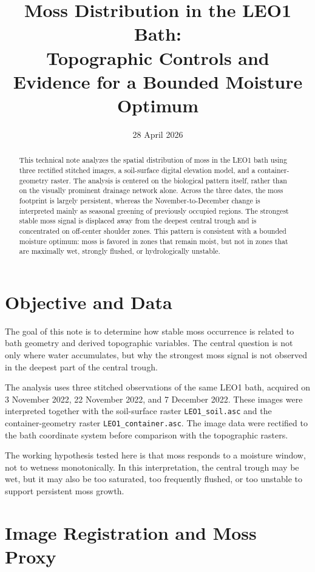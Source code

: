 \documentclass[11pt,a4paper]{article}
\title{Moss Distribution in the LEO1 Bath:\\
Topographic Controls and Evidence for a Bounded Moisture Optimum}
\author{}
\date{28 April 2026}
\begin{document}
\maketitle

\begin{abstract}
This technical note analyzes the spatial distribution of moss in the LEO1 bath
using three rectified stitched images, a soil-surface digital elevation model,
and a container-geometry raster. The analysis is centered on the biological
pattern itself, rather than on the visually prominent drainage network alone.
Across the three dates, the moss footprint is largely persistent, whereas the
November-to-December change is interpreted mainly as seasonal greening of
previously occupied regions. The strongest stable moss signal is displaced away
from the deepest central trough and is concentrated on off-center shoulder zones.
This pattern is consistent with a bounded moisture optimum: moss is favored in
zones that remain moist, but not in zones that are maximally wet, strongly
flushed, or hydrologically unstable.
\end{abstract}

\section{Objective and Data}

The goal of this note is to determine how stable moss occurrence is related to
bath geometry and derived topographic variables. The central question is not
only where water accumulates, but why the strongest moss signal is not observed
in the deepest part of the central trough.

The analysis uses three stitched observations of the same LEO1 bath, acquired
on 3 November 2022, 22 November 2022, and 7 December 2022. These images were
interpreted together with the soil-surface raster \texttt{LEO1\_soil.asc} and
the container-geometry raster \texttt{LEO1\_container.asc}. The image data were
rectified to the bath coordinate system before comparison with the topographic
rasters.

The working hypothesis tested here is that moss responds to a moisture window,
not to wetness monotonically. In this interpretation, the central trough may be
wet, but it may also be too saturated, too frequently flushed, or too unstable
to support persistent moss growth.

\section{Image Registration and Moss Proxy}
\end{document}
